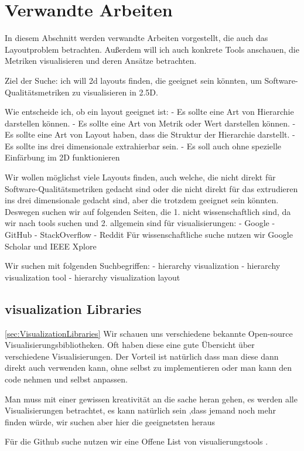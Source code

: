 \section{Verwandte Arbeiten} \label{sec:VerwandteArbeiten}
In diesem Abschnitt werden verwandte Arbeiten vorgestellt, die auch das Layoutproblem betrachten.
Außerdem will ich auch konkrete Tools anschauen, die Metriken visualisieren und deren Ansätze betrachten.


Ziel der Suche:
ich will 2d layouts finden, die geeignet sein könnten, um Software-Qualitätsmetriken zu visualisieren in 2.5D.

Wie entscheide ich, ob ein layout geeignet ist:
- Es sollte eine Art von Hierarchie darstellen können.
- Es sollte eine Art von Metrik oder Wert darstellen können.
- Es sollte eine Art von Layout haben, dass die Struktur der Hierarchie darstellt.
- Es sollte ins drei dimensionale extrahierbar sein.
- Es soll auch ohne spezielle Einfärbung im 2D funktionieren

Wir wollen möglichst viele Layouts finden, auch welche, die nicht direkt für Software-Qualitätsmetriken gedacht sind oder die nicht direkt für das extrudieren ins drei dimensionale gedacht sind, aber die trotzdem geeignet sein könnten.
Deswegen suchen wir auf folgenden Seiten, die 1. nicht wissenschaftlich sind, da wir nach tools suchen und 2. allgemein sind für visualisierungen:
- Google
- GitHub
- StackOverflow
- Reddit
Für wissenschaftliche suche nutzen wir Google Scholar und IEEE Xplore

Wir suchen mit folgenden Suchbegriffen:
- hierarchy visualization
- hierarchy visualization tool
- hierarchy visualization layout

\subsection{visualization Libraries} \ref{sec:VisualizationLibraries}
Wir schauen uns verschiedene bekannte Open-source Visualisierungsbibliotheken. Oft haben diese eine gute Übersicht über verschiedene Visualisierungen. Der Vorteil ist natürlich dass man diese dann direkt auch verwenden kann, ohne selbst zu implementieren oder man kann den code nehmen und selbst anpassen.

Man muss mit einer gewissen kreativität an die sache heran gehen, es werden alle Visualisierungen betrachtet, es kann natürlich sein ,dass jemand noch mehr finden würde, wir suchen aber hier die geeignetsten heraus

Für die Github suche nutzen wir eine Offene List von visualierungstools \cite{awesome_2025}.

